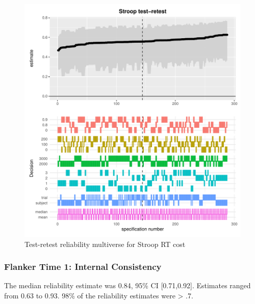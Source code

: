 \documentclass[english,man,floatsintext]{apa6}
\begin{document}
\begin{figure}
\centering
\includegraphics{Reliability_Multiverse_files/figure-latex/unnamed-chunk-7-1.pdf}
\caption{\label{fig:unnamed-chunk-7}Test-retest reliability multiverse for Stroop RT cost}
\end{figure}

\newpage

\hypertarget{flanker-time-1-internal-consistency}{%
\subsubsection{Flanker Time 1: Internal Consistency}\label{flanker-time-1-internal-consistency}}

The median reliability estimate was 0.84, 95\% CI {[}0.71,0.92{]}. Estimates ranged from 0.63 to 0.93. 98\% of the reliability estimates were \textgreater{} .7.
\end{document}
